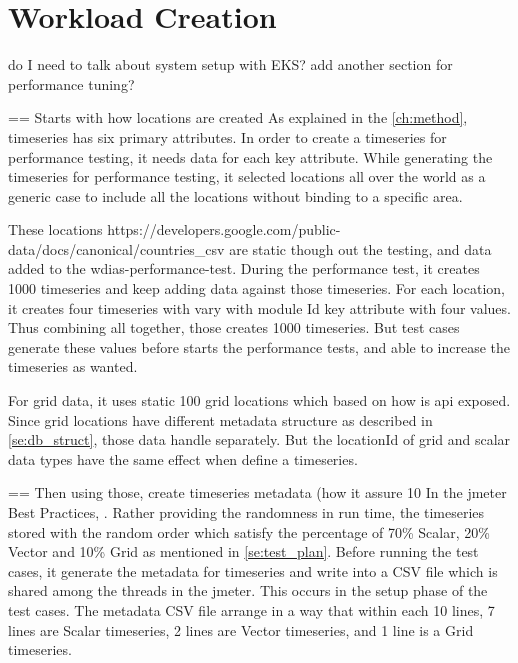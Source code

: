 \section{Workload Creation}


do I need to talk about system setup with EKS?
add another section for performance tuning?

== Starts with how locations are created
As explained in the \ref{ch:method}, timeseries has six primary attributes. In order to create a timeseries for performance testing, it needs data for each key attribute.
While generating the timeseries for performance testing, it selected locations all over the world as a generic case to include all the locations without binding to a specific area.

These locations https://developers.google.com/public-data/docs/canonical/countries\_csv are static though out the testing, and data added to the wdias-performance-test.
During the performance test, it creates 1000 timeseries and keep adding data against those timeseries. For each location, it creates four timeseries with vary with module Id key attribute with four values. Thus combining all together, those creates 1000 timeseries. But test cases generate these values before starts the performance tests, and able to increase the timeseries as wanted.

For grid data, it uses static 100 grid locations which based on how is \acrshort{api} exposed. Since grid locations have different metadata structure as described in \ref{se:db_struct}, those data handle separately. But the locationId of grid and scalar data types have the same effect when define a timeseries.

== Then using those, create timeseries metadata (how it assure 10%
In the \acrshort{jmeter} Best Practices, . Rather providing the randomness in run time, the timeseries stored with the random order which satisfy the percentage of 70\% Scalar, 20\% Vector and 10\% Grid as mentioned in \ref{se:test_plan}.
Before running the test cases, it generate the metadata for timeseries and write into a CSV file which is shared among the threads in the \acrshort{jmeter}. This occurs in the setup phase of the test cases. The metadata CSV file arrange in a way that within each 10 lines, 7 lines are Scalar timeseries, 2 lines are Vector timeseries, and 1 line is a Grid timeseries.

